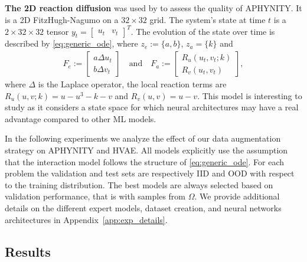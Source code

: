 \documentclass{article}
\newcommand\appref{Appendix~\ref}
\begin{document}
\textbf{The 2D reaction diffusion} was used by \citet{APHYNITY} to assess the quality of APHYNITY. It is a 2D FitzHugh-Nagumo on a $32 \times 32$ grid. The system's state at time $t$ is a $2\times 32 \times 32$ tensor $y_t = \begin{bmatrix}u_t & v_t\end{bmatrix}^T$. The evolution of the state over time is described by \eqref{eq:generic_ode}, where $z_e:=\{a, b\}$, $z_a= \{k\}$ and 
\begin{align}
    F_e := \begin{bmatrix}a \Delta u_t \\ b \Delta v_t \end{bmatrix} \quad \text{and} \quad F_a := \begin{bmatrix}R_u(u_t, v_t;k) \\R_v(u_t, v_t)\end{bmatrix},
\end{align}
where $\Delta$ is the Laplace operator, the local reaction terms are $R_u(u, v;k) = u - u^3 - k -v$ and $R_v(u, v) = u - v$.
This model is interesting to study as it considers a state space for which neural architectures may have a real advantage compared to other ML models.


In the following experiments we analyze the effect of our data augmentation strategy on APHYNITY and HVAE. All models explicitly use the assumption that the interaction model follows the structure of \eqref{eq:generic_ode}. For each problem the validation and test sets are respectively IID and OOD with respect to the training distribution. The best models are always selected based on validation performance, that is with samples from $\Omega$. We provide additional details on the different expert models, dataset creation, and neural networks architectures in \appref{app:exp_details}.

\subsection{Results}
\end{document}
